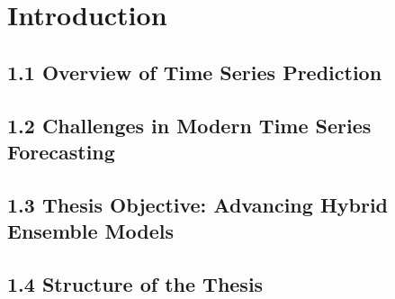 \chapter{Introduction}

\section{1.1 Overview of Time Series Prediction}


\section{1.2 Challenges in Modern Time Series Forecasting}

\section{1.3 Thesis Objective: Advancing Hybrid Ensemble Models}

\section{1.4 Structure of the Thesis }